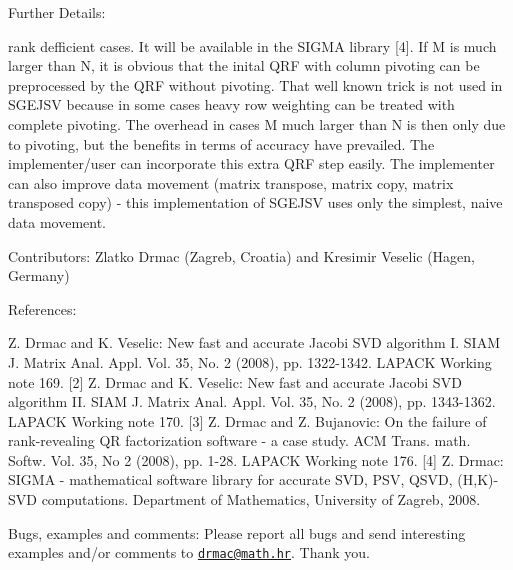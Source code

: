 \begin{DoxyParagraph}{Further Details\+: }
\begin{DoxyVerb}
  rank defficient cases. It will be available in the SIGMA library [4].
  If M is much larger than N, it is obvious that the inital QRF with
  column pivoting can be preprocessed by the QRF without pivoting. That
  well known trick is not used in SGEJSV because in some cases heavy row
  weighting can be treated with complete pivoting. The overhead in cases
  M much larger than N is then only due to pivoting, but the benefits in
  terms of accuracy have prevailed. The implementer/user can incorporate
  this extra QRF step easily. The implementer can also improve data movement
  (matrix transpose, matrix copy, matrix transposed copy) - this
  implementation of SGEJSV uses only the simplest, naive data movement.\end{DoxyVerb}
 
\end{DoxyParagraph}
\begin{DoxyParagraph}{Contributors\+: }
Zlatko Drmac (Zagreb, Croatia) and Kresimir Veselic (Hagen, Germany) 
\end{DoxyParagraph}
\begin{DoxyParagraph}{References\+: }
\begin{DoxyVerb} [1] Z. Drmac and K. Veselic: New fast and accurate Jacobi SVD algorithm I.
     SIAM J. Matrix Anal. Appl. Vol. 35, No. 2 (2008), pp. 1322-1342.
     LAPACK Working note 169.
 [2] Z. Drmac and K. Veselic: New fast and accurate Jacobi SVD algorithm II.
     SIAM J. Matrix Anal. Appl. Vol. 35, No. 2 (2008), pp. 1343-1362.
     LAPACK Working note 170.
 [3] Z. Drmac and Z. Bujanovic: On the failure of rank-revealing QR
     factorization software - a case study.
     ACM Trans. math. Softw. Vol. 35, No 2 (2008), pp. 1-28.
     LAPACK Working note 176.
 [4] Z. Drmac: SIGMA - mathematical software library for accurate SVD, PSV,
     QSVD, (H,K)-SVD computations.
     Department of Mathematics, University of Zagreb, 2008.\end{DoxyVerb}
 
\end{DoxyParagraph}
\begin{DoxyParagraph}{Bugs, examples and comments\+: }
Please report all bugs and send interesting examples and/or comments to \href{mailto:drmac@math.hr}{\tt drmac@math.\+hr}. Thank you. 
\end{DoxyParagraph}
\hypertarget{group__realGEsing_gac2cd4f1079370ac908186d77efcd5ea8}{}
